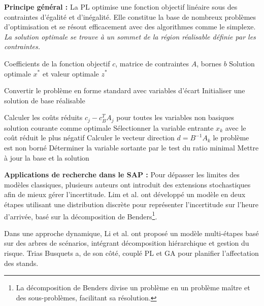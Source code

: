 \textbf{Principe général :} La \ac{PL} optimise une fonction objectif linéaire sous des contraintes d’égalité et d’inégalité. Elle constitue la base de nombreux problèmes d’optimisation et se résout efficacement avec des algorithmes comme le simplexe. \textit{La solution optimale se trouve à un sommet de la région réalisable définie par les contraintes.}
\begin{algorithm}[H]
	\caption{Méthode du Simplexe pour la Programmation Linéaire}
	\label{alg:simplex}
	\begin{algorithmic}[1]
		\Require Coefficients de la fonction objectif $c$, matrice de contraintes $A$, bornes $b$
		\Ensure Solution optimale $x^*$ et valeur optimale $z^*$
		
		\State Convertir le problème en forme standard avec variables d'écart
		\State Initialiser une solution de base réalisable
		
		\Repeat
		\State Calculer les coûts réduits $c_j - c_B^T A_j$ pour toutes les variables non basiques
		\State \Return solution courante comme optimale
		\EndIf
		\State Sélectionner la variable entrante $x_k$ avec le coût réduit le plus négatif
		\State Calculer le vecteur direction $d = B^{-1} A_k$
		\State \Return le problème est non borné
		\EndIf
		\State Déterminer la variable sortante par le test du ratio minimal
		\State Mettre à jour la base et la solution
	\end{algorithmic}
\end{algorithm}
\vspace{-0.5em}
\textbf{Applications de recherche dans le SAP :}  
Pour dépasser les limites des modèles classiques, plusieurs auteurs ont introduit des extensions stochastiques afin de mieux gérer l’incertitude. Lim et al. \cite{Lim_2005} ont développé un modèle en deux étapes utilisant une distribution discrète pour représenter l’incertitude sur l’heure d’arrivée, basé sur la décomposition de Benders\footnote{La décomposition de Benders divise un problème en un problème maître et des sous-problèmes, facilitant sa résolution.}.

Dans une approche dynamique, Li et al. \cite{Li_2021} ont proposé un modèle multi-étapes basé sur des arbres de scénarios, intégrant décomposition hiérarchique et gestion du risque. Trias Busquets \cite{NilBusquetsTrias} a, de son côté, couplé \ac{PL} et \ac{GA} pour planifier l’affectation des stands.

\vspace{-0.5em}
